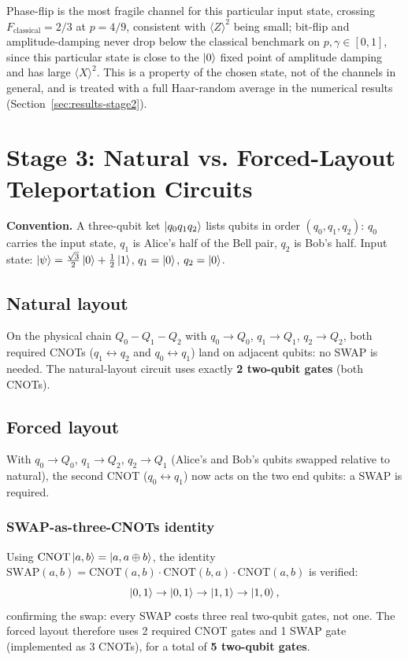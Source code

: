 \documentclass[11pt]{article}
\begin{document}
Phase-flip is the most fragile channel for this particular input state, crossing $F_{\text{classical}}=2/3$ at $p=4/9$, consistent with $\langle Z\rangle^2$ being small; bit-flip and amplitude-damping never drop below the classical benchmark on $p,\gamma\in[0,1]$, since this particular state is close to the $\ket0$ fixed point of amplitude damping and has large $\langle X\rangle^2$. This is a property of the chosen state, not of the channels in general, and is treated with a full Haar-random average in the numerical results (Section~\ref{sec:results-stage2}).

\section{Stage 3: Natural vs. Forced-Layout Teleportation Circuits}
\label{sec:stage3-theory}

\textbf{Convention.} A three-qubit ket $\ket{q_0q_1q_2}$ lists qubits in order $(q_0,q_1,q_2)$: $q_0$ carries the input state, $q_1$ is Alice's half of the Bell pair, $q_2$ is Bob's half. Input state: $\ket\psi=\tfrac{\sqrt3}{2}\ket0+\tfrac12\ket1$, $q_1=\ket0$, $q_2=\ket0$.

\subsection{Natural layout}

On the physical chain $Q_0-Q_1-Q_2$ with $q_0\to Q_0$, $q_1\to Q_1$, $q_2\to Q_2$, both required CNOTs ($q_1\leftrightarrow q_2$ and $q_0\leftrightarrow q_1$) land on adjacent qubits: no SWAP is needed. The natural-layout circuit uses exactly \textbf{2 two-qubit gates} (both CNOTs).

\subsection{Forced layout}

With $q_0\to Q_0$, $q_1\to Q_2$, $q_2\to Q_1$ (Alice's and Bob's qubits swapped relative to natural), the second CNOT ($q_0\leftrightarrow q_1$) now acts on the two end qubits: a SWAP is required.

\subsubsection{SWAP-as-three-CNOTs identity}

Using $\text{CNOT}\ket{a,b}=\ket{a,a\oplus b}$, the identity $\text{SWAP}(a,b)=\text{CNOT}(a,b)\cdot\text{CNOT}(b,a)\cdot\text{CNOT}(a,b)$ is verified:
\begin{equation}
\ket{0,1}\to\ket{0,1}\to\ket{1,1}\to\ket{1,0},
\label{eq:swap-identity}
\end{equation}
confirming the swap: every SWAP costs three real two-qubit gates, not one. The forced layout therefore uses 2 required CNOT gates and 1 SWAP gate (implemented as 3 CNOTs), for a total of \textbf{5 two-qubit gates}.
\end{document}
